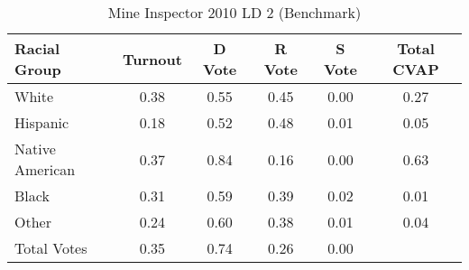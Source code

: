\begin{table}[htb]
\begin{center}
\caption{Mine Inspector 2010 LD 2 (Benchmark)}
\label{smine_cvap_ld_2_benchmark}
\begin{tabular}{lccccc}
  \hline
Racial Group & Turnout & D Vote & R Vote & S Vote & Total CVAP \\ 
  \hline
White & 0.38 & 0.55 & 0.45 & 0.00 & 0.27 \\ 
  Hispanic & 0.18 & 0.52 & 0.48 & 0.01 & 0.05 \\ 
  Native American & 0.37 & 0.84 & 0.16 & 0.00 & 0.63 \\ 
  Black & 0.31 & 0.59 & 0.39 & 0.02 & 0.01 \\ 
  Other & 0.24 & 0.60 & 0.38 & 0.01 & 0.04 \\ 
  Total Votes & 0.35 & 0.74 & 0.26 & 0.00 &  \\ 
   \hline
\end{tabular}
\end{center}
\end{table}
